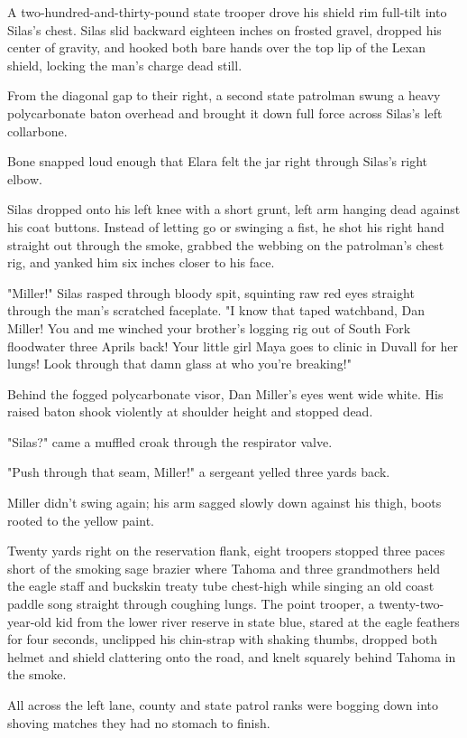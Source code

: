 A two-hundred-and-thirty-pound state trooper drove his shield rim full-tilt into Silas's chest. Silas slid backward eighteen inches on frosted gravel, dropped his center of gravity, and hooked both bare hands over the top lip of the Lexan shield, locking the man's charge dead still.

From the diagonal gap to their right, a second state patrolman swung a heavy polycarbonate baton overhead and brought it down full force across Silas's left collarbone.

Bone snapped loud enough that Elara felt the jar right through Silas's right elbow.

Silas dropped onto his left knee with a short grunt, left arm hanging dead against his coat buttons. Instead of letting go or swinging a fist, he shot his right hand straight out through the smoke, grabbed the webbing on the patrolman's chest rig, and yanked him six inches closer to his face.

"Miller!" Silas rasped through bloody spit, squinting raw red eyes straight through the man's scratched faceplate. "I know that taped watchband, Dan Miller! You and me winched your brother's logging rig out of South Fork floodwater three Aprils back! Your little girl Maya goes to clinic in Duvall for her lungs! Look through that damn glass at who you're breaking!"

Behind the fogged polycarbonate visor, Dan Miller's eyes went wide white. His raised baton shook violently at shoulder height and stopped dead.

"Silas?" came a muffled croak through the respirator valve.

"Push through that seam, Miller!" a sergeant yelled three yards back.

Miller didn't swing again; his arm sagged slowly down against his thigh, boots rooted to the yellow paint.

Twenty yards right on the reservation flank, eight troopers stopped three paces short of the smoking sage brazier where Tahoma and three grandmothers held the eagle staff and buckskin treaty tube chest-high while singing an old coast paddle song straight through coughing lungs. The point trooper, a twenty-two-year-old kid from the lower river reserve in state blue, stared at the eagle feathers for four seconds, unclipped his chin-strap with shaking thumbs, dropped both helmet and shield clattering onto the road, and knelt squarely behind Tahoma in the smoke.

All across the left lane, county and state patrol ranks were bogging down into shoving matches they had no stomach to finish.

